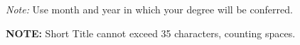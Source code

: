 %

\begin{spacing}{1.0}

\end{spacing}
\nocite{*}
%
%
\begin{thesisauthorvita}
%
%

\end{thesisauthorvita}

\flushleft
\textit{Note:} Use month and year in which your degree will be conferred.

\begin{thesisshorttitlepage}
{\small \textbf{NOTE:} Short Title cannot exceed 35 characters, counting
spaces.}
\end{thesisshorttitlepage}

